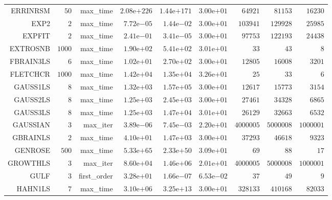 \begin{longtable}{rrrrrrrrr}
ERRINRSM & \(    50\) & max\_time & \(2.08\)e\(+226\) & \(1.44\)e\(+171\) & \( 3.00\)e\(+01\) & \( 64921\) & \( 81153\) & \( 16230\) \\
EXP2 & \(     2\) & max\_time & \( 7.72\)e\(-05\) & \( 1.44\)e\(-02\) & \( 3.00\)e\(+01\) & \(103941\) & \(129928\) & \( 25985\) \\
EXPFIT & \(     2\) & max\_time & \( 2.41\)e\(-01\) & \( 3.41\)e\(-05\) & \( 3.00\)e\(+01\) & \( 97753\) & \(122193\) & \( 24438\) \\
EXTROSNB & \(  1000\) & max\_time & \( 1.90\)e\(+02\) & \( 5.41\)e\(+02\) & \( 3.01\)e\(+01\) & \(    33\) & \(    43\) & \(     8\) \\
FBRAIN3LS & \(     6\) & max\_time & \( 1.02\)e\(+01\) & \( 2.70\)e\(+02\) & \( 3.00\)e\(+01\) & \( 12805\) & \( 16008\) & \(  3201\) \\
FLETCHCR & \(  1000\) & max\_time & \( 1.42\)e\(+04\) & \( 1.35\)e\(+04\) & \( 3.26\)e\(+01\) & \(    25\) & \(    33\) & \(     6\) \\
GAUSS1LS & \(     8\) & max\_time & \( 1.32\)e\(+03\) & \( 1.57\)e\(+05\) & \( 3.00\)e\(+01\) & \( 12617\) & \( 15773\) & \(  3154\) \\
GAUSS2LS & \(     8\) & max\_time & \( 1.25\)e\(+03\) & \( 2.45\)e\(+03\) & \( 3.00\)e\(+01\) & \( 27461\) & \( 34328\) & \(  6865\) \\
GAUSS3LS & \(     8\) & max\_time & \( 1.25\)e\(+03\) & \( 1.47\)e\(+04\) & \( 3.01\)e\(+01\) & \( 26129\) & \( 32663\) & \(  6532\) \\
GAUSSIAN & \(     3\) & max\_iter & \( 3.89\)e\(-06\) & \( 7.45\)e\(-03\) & \( 2.20\)e\(+01\) & \(4000005\) & \(5000008\) & \(1000001\) \\
GBRAINLS & \(     2\) & max\_time & \( 4.10\)e\(+01\) & \( 1.47\)e\(+03\) & \( 3.00\)e\(+01\) & \( 37293\) & \( 46618\) & \(  9323\) \\
GENROSE & \(   500\) & max\_time & \( 5.33\)e\(+65\) & \( 2.33\)e\(+50\) & \( 3.09\)e\(+01\) & \(    69\) & \(    88\) & \(    17\) \\
GROWTHLS & \(     3\) & max\_iter & \( 8.60\)e\(+04\) & \( 1.46\)e\(+06\) & \( 2.01\)e\(+01\) & \(4000005\) & \(5000008\) & \(1000001\) \\
GULF & \(     3\) & first\_order & \( 3.28\)e\(+01\) & \( 1.66\)e\(-07\) & \( 6.53\)e\(-02\) & \(    37\) & \(    49\) & \(     9\) \\
HAHN1LS & \(     7\) & max\_time & \( 3.10\)e\(+06\) & \( 3.25\)e\(+13\) & \( 3.00\)e\(+01\) & \(328133\) & \(410168\) & \( 82033\) \\

\end{longtable}
